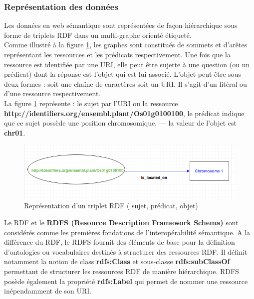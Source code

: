\subsubsection*{Représentation des données}

Les données en web sémantique sont représentées de façon hiérarchique sous forme de triplets RDF dans un multi-graphe orienté étiqueté.\\

Comme illustré à la figure  \ref{triplet}, les graphes sont constitués de sommets et d’arêtes représentant les ressources et les prédicats respectivement. Une fois que la ressource est identifiée par une URI, elle peut être sujette à une question (ou un prédicat) dont la réponse est l’objet qui est lui associé. L’objet peut être sous deux formes : soit une chaîne de caractères soit un URI. Il s’agit d’un litéral ou d’une ressource respectivement.\\

La figure \ref{triplet} représente :
le sujet par l’URI ou la ressource \\ 
\textbf{http://identifiers.org/ensembl.plant/Os01g0100100},
le prédicat indique que ce sujet possède une position chromosomique, — la valeur de l’objet est \textbf{chr01}.

\begin{figure}[!ht]
\begin{center}
	\includegraphics[width=1\textwidth]{Figures/rdf-example.png}
\end{center}
\caption{\label{triplet} Représentation d'un triplet RDF ( {\color{green}sujet}, prédicat, {\color{blue}objet})}
\end{figure}


Le RDF et le \textbf{RDFS (Resource Description Framework Schema)} sont considérés comme les premières fondations de l’interopérabilité sémantique. A la différence du RDF, le RDFS fournit des éléments de base pour la définition d'ontologies ou vocabulaires destinés à structurer des ressources RDF. Il définit notamment la notion de class \textbf{rdfs:Class} et sous-classe \textbf{rdfs:subClassOf} permettant de structurer les ressources RDF de manière hiérarchique. RDFS posède également la propriété \textbf{rdfs:Label} qui permet de nommer une ressource inépendamment de son URI.\\

